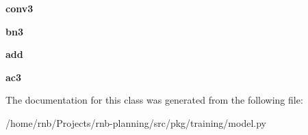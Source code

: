 \begin{DoxyCompactItemize}
{\bfseries conv3}
\item 
\mbox{\label{classrnb-planning_1_1src_1_1pkg_1_1training_1_1model_1_1_identity_block_a367cc5eac825674208b0061b8086ba02}} 
{\bfseries bn3}
\item 
\mbox{\label{classrnb-planning_1_1src_1_1pkg_1_1training_1_1model_1_1_identity_block_a685c36b77cc563d3f6f27dbd06fbb981}} 
{\bfseries add}
\item 
\mbox{\label{classrnb-planning_1_1src_1_1pkg_1_1training_1_1model_1_1_identity_block_a043901ccf0c410b2dc899d741503300f}} 
{\bfseries ac3}
\end{DoxyCompactItemize}


The documentation for this class was generated from the following file\+:\begin{DoxyCompactItemize}
\item 
/home/rnb/\+Projects/rnb-\/planning/src/pkg/training/model.\+py\end{DoxyCompactItemize}
